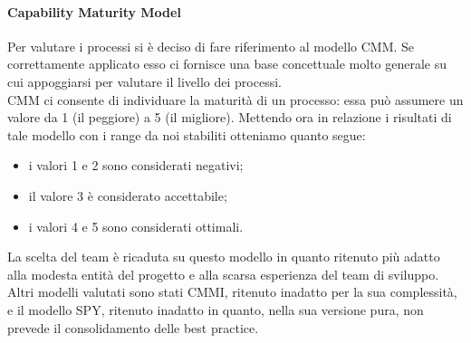 				\paragraph{Capability Maturity Model}
					Per valutare i processi si è deciso di fare riferimento al modello CMM. Se correttamente applicato esso ci fornisce una base 
					concettuale molto generale su cui appoggiarsi per valutare il livello dei processi.\\
					CMM ci consente di individuare la maturità di un processo: essa può assumere un valore da 1 (il peggiore) a 5 (il migliore). Mettendo 
					ora in relazione i risultati di tale modello con i range da noi stabiliti otteniamo quanto segue:
					\begin{itemize}
						\item i valori 1 e 2 sono considerati negativi;
						\item il valore 3 è considerato accettabile;
						\item i valori 4 e 5 sono considerati ottimali.
					\end{itemize}
					La scelta del team è ricaduta su questo modello in quanto ritenuto più adatto alla modesta entità del progetto e alla scarsa esperienza del 
					team di sviluppo. Altri modelli valutati sono stati CMMI, ritenuto inadatto per la sua complessità, e il modello SPY, ritenuto inadatto in 
					quanto, nella sua versione pura, non prevede il consolidamento delle best practice.
